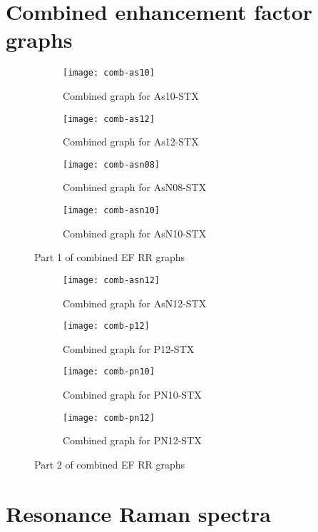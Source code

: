 \newpage
\section{Combined enhancement factor graphs}

\begin{figure*}[h]
\centering
\begin{subfigure}{8.25cm}\centering\texttt{[image: comb-as10]}\caption{Combined graph for As10-STX}\end{subfigure}%
\begin{subfigure}{8.25cm}\centering\texttt{[image: comb-as12]}\caption{Combined graph for As12-STX}\end{subfigure}
\begin{subfigure}{8.25cm}\centering\texttt{[image: comb-asn08]}\caption{Combined graph for AsN08-STX}\end{subfigure}%
\begin{subfigure}{8.25cm}\centering\texttt{[image: comb-asn10]}\caption{Combined graph for AsN10-STX}\end{subfigure}
\caption[Part 1 of combined EF RR graphs]{Part 1 of combined EF RR graphs}
\end{figure*}

\newpage

\begin{figure*}[h]
\centering
\begin{subfigure}{8.25cm}\centering\texttt{[image: comb-asn12]}\caption{Combined graph for AsN12-STX}\end{subfigure}%
\begin{subfigure}{8.25cm}\centering\texttt{[image: comb-p12]}\caption{Combined graph for P12-STX}\end{subfigure}
\begin{subfigure}{8.25cm}\centering\texttt{[image: comb-pn10]}\caption{Combined graph for PN10-STX}\end{subfigure}%
\begin{subfigure}{8.25cm}\centering\texttt{[image: comb-pn12]}\caption{Combined graph for PN12-STX}\end{subfigure}
\caption[Part 2 of combined EF RR graphs]{Part 2 of combined EF RR graphs}
\end{figure*}


\newpage
\section{Resonance Raman spectra}

